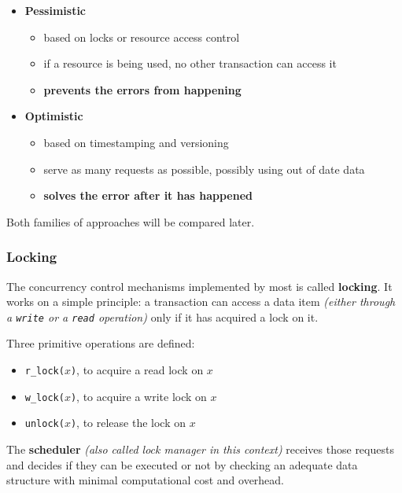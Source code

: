 \documentclass[english]{article}
\begin{document}
\begin{itemize}
  \item \textbf{Pessimistic}
        \begin{itemize}
          \item based on locks or resource access control
          \item if a resource is being used, no other transaction can access it
          \item \textbf{prevents the errors from happening}
        \end{itemize}
  \item \textbf{Optimistic}
        \begin{itemize}
          \item based on timestamping and versioning
          \item serve as many requests as possible, possibly using out of date data
          \item \textbf{solves the error after it has happened}
        \end{itemize}
\end{itemize}

Both families of approaches will be compared later.

\subsubsection{Locking}

The concurrency control mechanisms implemented by most \DBMS is called \textbf{locking}.
It works on a simple principle: a transaction can access a data item \textit{(either through a \texttt{write} or a \texttt{read} operation)} only if it has acquired a lock on it.

Three primitive operations are defined:

\begin{itemize}
  \item \texttt{r\_lock(\(x\))}, to acquire a read lock on \(x\)
  \item \texttt{w\_lock(\(x\))}, to acquire a write lock on \(x\)
  \item \texttt{unlock(\(x\))}, to release the lock on \(x\)
\end{itemize}

The \textbf{scheduler} \textit{(also called lock manager in this context)} receives those requests and decides if they can be executed or not by checking an adequate data structure with minimal computational cost and overhead.
\end{document}
